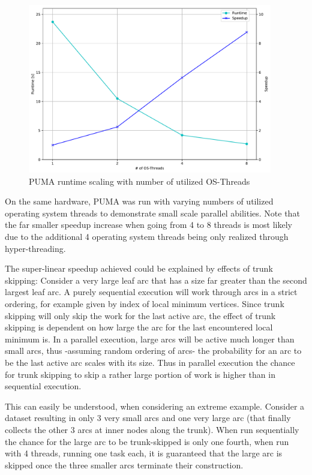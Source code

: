 \documentclass[%
	paper=A4,					%
	twoside=true,				%
	openright,					%
	parskip=full,				%
	chapterprefix=true,			%
	11pt,						%
	headings=normal,			%
	bibliography=totoc,			%
	listof=totoc,				%
	titlepage=on,				%
	captions=tableabove,		%
	draft=false,				%
]{scrreprt}%
\begin{document}
\begin{figure}[h]
\centering
\includegraphics[width=0.95\textwidth]{figures/resscale.pdf}
\caption{PUMA runtime scaling with number of utilized OS-Threads}
\label{fig:resscale}
\end{figure}

On the same hardware, PUMA was run with varying numbers of utilized operating system threads to demonstrate small scale parallel abilities. Note that the far smaller speedup increase when going from 4 to 8 threads is most likely due to the additional 4 operating system threads being only realized through hyper-threading. 

The super-linear speedup achieved could be explained by effects of trunk skipping: Consider a very large leaf arc that has a size far greater than the second largest leaf arc. A purely sequential execution will work through arcs in a strict ordering, for example given by index of local minimum vertices. Since trunk skipping will only skip the work for the last active arc, the effect of trunk skipping is dependent on how large the arc for the last encountered local minimum is. In a parallel execution, large arcs will be active much longer than small arcs, thus -assuming random ordering of arcs- the probability for an arc to be the last active arc scales with its size. Thus in parallel execution the chance for trunk skipping to skip a rather large portion of work is higher than in sequential execution. 

This can easily be understood, when considering an extreme example. Consider a dataset resulting in only 3 very small arcs and one very large arc (that finally collects the other 3 arcs at inner nodes along the trunk). When run sequentially the chance for the large arc to be trunk-skipped is only one fourth, when run with 4 threads, running one task each, it is guaranteed that the large arc is skipped once the three smaller arcs terminate their construction.
\end{document}
